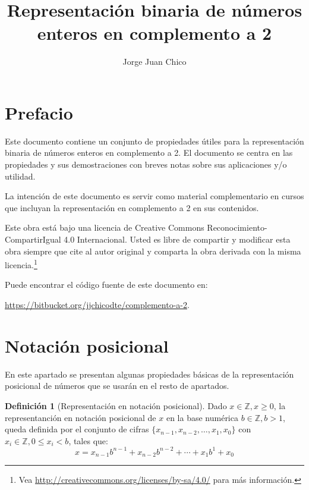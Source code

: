 \documentclass[spanish,a4paper,12pt,titlepage]{article}
\title{Representación binaria de números enteros en complemento a 2}
\author{Jorge Juan Chico}
\affil{\textit{jjchico@dte.us.es}}
\affil{Departamento de Tecnología Electrónica. Universidad de Sevilla}
\theoremstyle{definition}
\newtheorem{definition}{Definición}%
\theoremstyle{remark}
\newcommand{\bbZ}{\mathbb{Z}}
\begin{document}
\maketitle
\newpage
\tableofcontents
\newpage

\section*{Prefacio}

Este documento contiene un conjunto de propiedades útiles para la representación binaria de números enteros en complemento a 2. El documento se centra en las propiedades y sus demostraciones con breves notas sobre sus aplicaciones y/o utilidad.

La intención de este documento es servir como material complementario en cursos que incluyan la representación en complemento a 2 en sus contenidos.

Este obra está bajo una licencia de Creative Commons Reconocimiento-CompartirIgual 4.0 Internacional. Usted es libre de compartir y modificar esta obra siempre que cite al autor original y comparta la obra derivada con la misma licencia.\footnote{
Vea \url{http://creativecommons.org/licenses/by-sa/4.0/} para más información.
}

Puede encontrar el código fuente de este documento en:

\url{https://bitbucket.org/jjchicodte/complemento-a-2}.

\section{Notación posicional}

En este apartado se presentan algunas propiedades básicas de la representación posicional de números que se usarán en el resto de apartados.

\begin{definition}[Representación en notación posicional]
   Dado $x \in \bbZ, x \ge 0$, la representanción en notación posicional
   de $x$ en la base numérica $b \in \bbZ, b > 1$, queda definida por el
   conjunto de cifras $\{x_{n-1}, x_{n-2}, \ldots, x_1, x_0\}$ con $x_i \in
   \bbZ, 0 \le x_i < b$, tales que:
    \[
        x = x_{n-1} b^{n-1}+x_{n-2} b^{n-2}+ \cdots + x_1 b^1+x_0
    \]
\end{definition}
\end{document}
